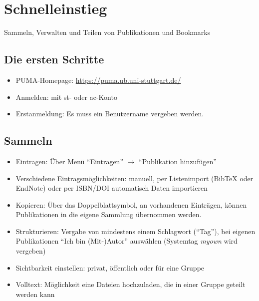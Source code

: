 \chapter{Schnelleinstieg}
Sammeln, Verwalten und Teilen von Publikationen und Bookmarks

\section{Die ersten Schritte}
\begin{itemize}
\item PUMA-Homepage: \url{https://puma.ub.uni-stuttgart.de/}
\item Anmelden: mit st- oder ac-Konto
\item Erstanmeldung: Es muss ein Benutzername vergeben werden.
\end{itemize}

\section{Sammeln}
\begin{itemize}
\item Eintragen: Über Menü \enquote{Eintragen} $\to$ \enquote{Publikation hinzufügen}
\item Verschiedene Eintragsmöglichkeiten: manuell, per Listenimport (BibTeX oder EndNote) oder per ISBN/DOI automatisch Daten importieren
\item Kopieren: Über das Doppelblattsymbol, an vorhandenen Einträgen, können Publikationen in die eigene Sammlung übernommen werden. 
\item Strukturieren: Vergabe von mindestens einem Schlagwort (\enquote{Tag}), bei eigenen Publikationen \enquote{Ich bin (Mit-)Autor} auswählen (Systemtag \textit{myown} wird vergeben) 
\item Sichtbarkeit einstellen: privat, öffentlich oder für eine Gruppe
\item Volltext: Möglichkeit eine Dateien hochzuladen, die in einer Gruppe geteilt werden kann
\end{itemize}

